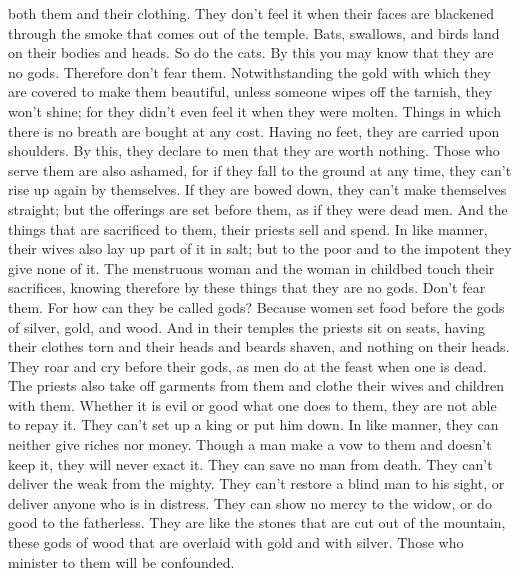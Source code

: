 both them and their clothing. They don't feel it  when
their faces are blackened through the smoke that comes out of the
temple.  Bats, swallows, and birds land on their bodies
and heads. So do the cats.  By this you may know that
they are no gods. Therefore don't fear them. 
Notwithstanding the gold with which they are covered to make them
beautiful, unless someone wipes off the tarnish, they won't shine; for
they didn't even feel it when they were molten.  Things
in which there is no breath are bought at any cost. 
Having no feet, they are carried upon shoulders. By this, they declare
to men that they are worth nothing.  Those who serve them
are also ashamed, for if they fall to the ground at any time, they can't
rise up again by themselves. If they are bowed down, they can't make
themselves straight; but the offerings are set before them, as if they
were dead men.  And the things that are sacrificed to
them, their priests sell and spend. In like manner, their wives also lay
up part of it in salt; but to the poor and to the impotent they give
none of it.  The menstruous woman and the woman in
childbed touch their sacrifices, knowing therefore by these things that
they are no gods. Don't fear them.  For how can they be
called gods? Because women set food before the gods of silver, gold, and
wood.  And in their temples the priests sit on seats,
having their clothes torn and their heads and beards shaven, and nothing
on their heads.  They roar and cry before their gods, as
men do at the feast when one is dead.  The priests also
take off garments from them and clothe their wives and children with
them.  Whether it is evil or good what one does to them,
they are not able to repay it. They can't set up a king or put him down.
 In like manner, they can neither give riches nor money.
Though a man make a vow to them and doesn't keep it, they will never
exact it.  They can save no man from death. They can't
deliver the weak from the mighty.  They can't restore a
blind man to his sight, or deliver anyone who is in distress.
 They can show no mercy to the widow, or do good to the
fatherless.  They are like the stones that are cut out of
the mountain, these gods of wood that are overlaid with gold and with
silver. Those who minister to them will be confounded.

